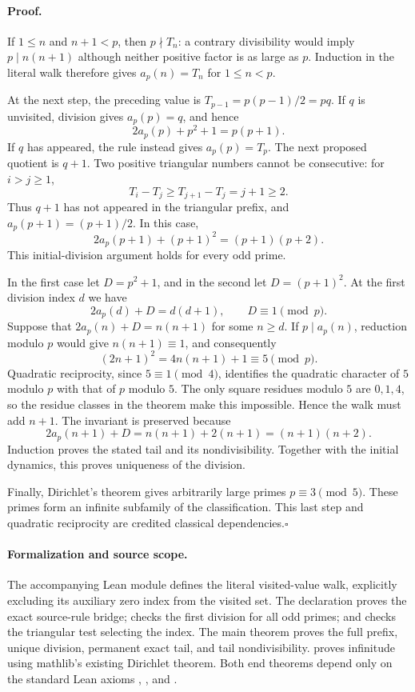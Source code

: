 \documentclass[11pt]{article}
\begin{document}
\paragraph{Proof.}
If $1\le n$ and $n+1<p$, then $p\nmid T_n$: a contrary divisibility
would imply $p\mid n(n+1)$ although neither positive factor is as large
as $p$. Induction in the literal walk therefore gives
$a_p(n)=T_n$ for $1\le n<p$.

At the next step, the preceding value is
$T_{p-1}=p(p-1)/2=pq$. If $q$ is unvisited, division gives
$a_p(p)=q$, and hence
\[
 2a_p(p)+p^2+1=p(p+1).
\]
If $q$ has appeared, the rule instead gives $a_p(p)=T_p$. The next
proposed quotient is $q+1$. Two positive triangular numbers cannot be
consecutive: for $i>j\ge1$,
\[
 T_i-T_j\ge T_{j+1}-T_j=j+1\ge2.
\]
Thus $q+1$ has not appeared in the triangular prefix, and
$a_p(p+1)=(p+1)/2$. In this case,
\[
 2a_p(p+1)+(p+1)^2=(p+1)(p+2).
\]
This initial-division argument holds for every odd prime.

In the first case let $D=p^2+1$, and in the second let $D=(p+1)^2$.
At the first division index $d$ we have
\[
 2a_p(d)+D=d(d+1),\qquad D\equiv1\pmod p.
\]
Suppose that $2a_p(n)+D=n(n+1)$ for some $n\ge d$. If
$p\mid a_p(n)$, reduction modulo $p$ would give $n(n+1)\equiv1$,
and consequently
\[
 (2n+1)^2=4n(n+1)+1\equiv5\pmod p.
\]
Quadratic reciprocity, since $5\equiv1\pmod4$, identifies the quadratic
character of $5$ modulo $p$ with that of $p$ modulo $5$. The only square
residues modulo $5$ are $0,1,4$, so the residue classes in the theorem
make this impossible. Hence the walk must add $n+1$. The invariant is
preserved because
\[
 2a_p(n+1)+D=n(n+1)+2(n+1)=(n+1)(n+2).
\]
Induction proves the stated tail and its nondivisibility. Together with
the initial dynamics, this proves uniqueness of the division.

Finally, Dirichlet's theorem gives arbitrarily large primes
$p\equiv3\pmod5$. These primes form an infinite subfamily of the
classification. This last step and quadratic reciprocity are credited
classical dependencies.\hfill$\square$

\paragraph{Formalization and source scope.}
The accompanying Lean module  defines the
literal visited-value walk, explicitly excluding its auxiliary zero
index from the visited set. The declaration
 proves the exact source-rule bridge;
 checks the first division for all odd
primes; and  checks the triangular test
selecting the index. The main theorem
 proves the full prefix, unique
division, permanent exact tail, and tail nondivisibility.
 proves infinitude using
mathlib's existing Dirichlet theorem. Both end theorems depend only on
the standard Lean axioms , ,
and .
\end{document}
